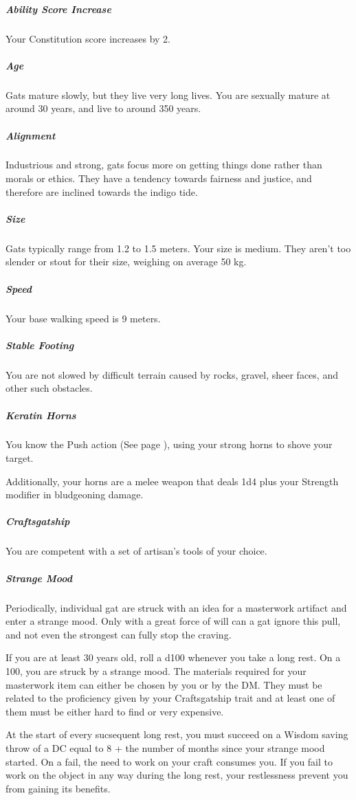     \subparagraph{Ability Score Increase} Your Constitution score increases by 2.

    \subparagraph{Age} Gats mature slowly, but they live very long lives.
    You are sexually mature at around 30 years, and live to around 350 years.

    \subparagraph{Alignment} Industrious and strong, gats focus more on getting things done rather than morals or ethics.
    They have a tendency towards fairness and justice, and therefore are inclined towards the indigo tide.

    \subparagraph{Size} Gats typically range from 1.2 to 1.5 meters.
    Your size is medium.
    They aren't too slender or stout for their size, weighing on average 50 kg.

    \subparagraph{Speed} Your base walking speed is 9 meters.

    \subparagraph{Stable Footing} You are not slowed by difficult terrain caused by rocks, gravel, sheer faces, and other such obstacles.

    \subparagraph{Keratin Horns} You know the Push action (See page \pageref{act::push}), using your strong horns to shove your target.

    Additionally, your horns are a melee weapon that deals 1d4 plus your Strength modifier in bludgeoning damage.

    \subparagraph{Craftsgatship} You are competent with a set of artisan's tools of your choice.

    \subparagraph{Strange Mood} Periodically, individual gat are struck with an idea for a masterwork artifact and enter a strange mood.
    Only with a great force of will can a gat ignore this pull, and not even the strongest can fully stop the craving.

    If you are at least 30 years old, roll a d100 whenever you take a long rest.
    On a 100, you are struck by a strange mood.
    The materials required for your masterwork item can either be chosen by you or by the DM.
    They must be related to the proficiency given by your Craftsgatship trait and at least one of them must be either hard to find or very expensive.

    At the start of every sucsequent long rest, you must succeed on a Wisdom saving throw of a DC equal to 8 + the number of months since your strange mood started.
    On a fail, the need to work on your craft consumes you.
    If you fail to work on the object in any way during the long rest, your restlessness prevent you from gaining its benefits.

